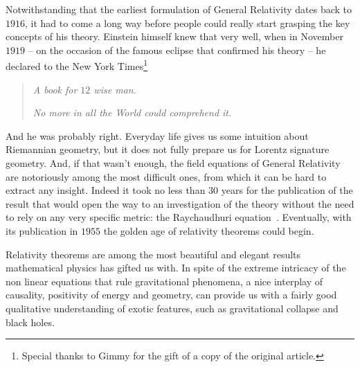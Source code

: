 Notwithstanding that the earliest formulation of General Relativity dates back to \(1916\), it had to come a long way before people could really start grasping the key concepts of his theory. Einstein himself knew that very well, when in November \(1919\) -- on the occasion of the famous eclipse that confirmed his theory -- he declared to the New York Times\footnote{Special thanks to Gimmy for the gift of a copy of the original article.}~\cite{nyt:lights-all-askew}
\begin{quote}
    \emph{A book for \(12\) wise man. }
    
    \emph{No more in all the World could comprehend it.}
\end{quote}
And he was probably right. Everyday life gives us some intuition about Riemannian geometry, but it does not fully prepare us for Lorentz signature geometry. And, if that wasn't enough, the field equations of General Relativity are notoriously among the most difficult ones, from which it can be hard to extract any insight. Indeed it took no less than \(30\) years for the publication of the result that would open the way to an investigation of the theory without the need to rely on any very specific metric: the Raychaudhuri equation~\cite[]{raychaudhuri1955relativistic}. Eventually, with its publication in \(1955\) the golden age of relativity theorems could begin.

Relativity theorems are among the most beautiful and elegant results mathematical physics has gifted us with. In spite of the extreme intricacy of the non linear equations that rule gravitational phenomena, a nice interplay of causality, positivity of energy and geometry, can provide us with a fairly good qualitative understanding of exotic features, such as gravitational collapse and black holes.

